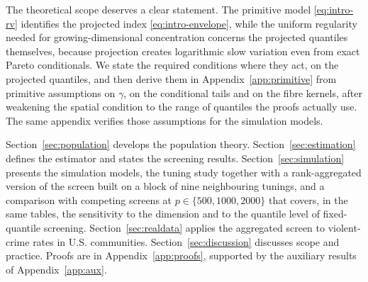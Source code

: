 The theoretical scope deserves a clear statement. The primitive model
\eqref{eq:intro-rv} identifies the projected index
\eqref{eq:intro-envelope}, while the uniform regularity needed for
growing-dimensional concentration concerns the projected quantiles
themselves, because projection creates logarithmic slow variation even
from exact Pareto conditionals. We state the required conditions where they
act, on the projected quantiles, and then derive them in
Appendix~\ref{app:primitive} from primitive assumptions on $\gamma$, on
the conditional tails and on the fibre kernels, after weakening the
spatial condition to the range of quantiles the proofs actually use. The
same appendix verifies those assumptions for the simulation models.

Section~\ref{sec:population} develops the population theory.
Section~\ref{sec:estimation} defines the estimator and states the screening
results. Section~\ref{sec:simulation} presents the simulation models, the tuning
study together with a rank-aggregated version of the screen built on a
block of nine neighbouring tunings, and a comparison with competing
screens at $p\in\{500,1000,2000\}$ that covers, in the same tables, the
sensitivity to the dimension and to the quantile level of fixed-quantile
screening. Section~\ref{sec:realdata} applies the aggregated screen to
violent-crime rates in U.S. communities.
Section~\ref{sec:discussion} discusses scope and practice. Proofs are in
Appendix~\ref{app:proofs}, supported by the auxiliary results of
Appendix~\ref{app:aux}.
